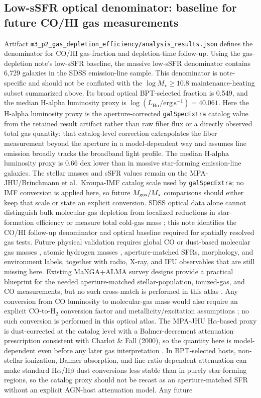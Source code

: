 \documentclass[twocolumn]{aastex631}
\begin{document}
\subsection{Low-sSFR optical denominator: baseline for future CO/HI gas measurements}
Artifact \texttt{m3\_p2\_gas\_depletion\_efficiency/analysis\_results.json} defines the denominator for CO/HI gas-fraction and depletion-time follow-up. Using the gas-depletion note's low-sSFR baseline, the massive low-sSFR denominator contains 6,729 galaxies in the SDSS emission-line sample. This denominator is note-specific and should not be conflated with the \(\log M_\star \geq 10.8\) maintenance-heating subset summarized above. Its broad optical BPT-selected fraction is 0.549, and the median H-alpha luminosity proxy is \(\log (L_{\mathrm{H}\alpha}/\mathrm{erg\,s^{-1}}) = 40.061\). Here the H-alpha luminosity proxy is the aperture-corrected \texttt{galSpecExtra} catalog value from the retained result artifact rather than raw fiber flux or a directly observed total gas quantity; that catalog-level correction extrapolates the fiber measurement beyond the aperture in a model-dependent way and assumes line emission broadly tracks the broadband light profile. The median H-alpha luminosity proxy is 0.66 dex lower than in massive star-forming emission-line galaxies. The stellar masses and sSFR values remain on the MPA-JHU/Brinchmann et al.\ Kroupa-IMF catalog scale used by \texttt{galSpecExtra}; no IMF conversion is applied here, so future \(M_{\rm gas}/M_\star\) comparisons should either keep that scale or state an explicit conversion. SDSS optical data alone cannot distinguish bulk molecular-gas depletion from localized reductions in star-formation efficiency or measure total cold-gas mass \citep{tacconi2018}; this note identifies the CO/HI follow-up denominator and optical baseline required for spatially resolved gas tests. Future physical validation requires global CO or dust-based molecular gas masses \citep[e.g., xCOLD GASS;][]{xcoldgass2017}, atomic hydrogen masses \citep[e.g., xGASS;][]{xgass2018}, aperture-matched SFRs, morphology, and environment labels, together with radio, X-ray, and IFU observables that are still missing here. Existing MaNGA+ALMA survey designs provide a practical blueprint for the needed aperture-matched stellar-population, ionized-gas, and CO measurements, but no such cross-match is performed in this atlas \citep{lin2020}. Any conversion from CO luminosity to molecular-gas mass would also require an explicit CO-to-H$_2$ conversion factor and metallicity/excitation assumptions \citep{bolatto2013,sandstrom2013}; no such conversion is performed in this optical atlas. The MPA-JHU H$\alpha$-based proxy is dust-corrected at the catalog level with a Balmer-decrement attenuation prescription consistent with Charlot \& Fall (2000), so the quantity here is model-dependent even before any later gas interpretation \citep{charlotfall2000}. In BPT-selected hosts, non-stellar ionization, Balmer absorption, and line-ratio-dependent attenuation can make standard H$\alpha$/H$\beta$ dust conversions less stable than in purely star-forming regions, so the catalog proxy should not be recast as an aperture-matched SFR without an explicit AGN-host attenuation model. Any future 
\end{document}
